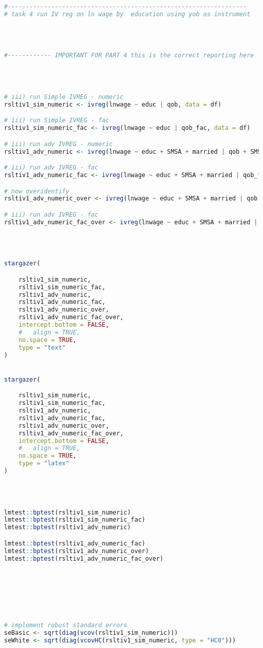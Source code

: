 \documentclass[a4paper]{article}
\begin{document}
\begin{lstlisting}[language=R]
#------------------------------------------------------------------
# task 4 run IV reg on ln wage by  education using yob as instrument




#------------ IMPORTANT FOR PART 4 this is the correct reporting here




# iii) run Simple IVREG - numeric
rsltiv1_sim_numeric <- ivreg(lnwage ~ educ | qob, data = df)

# iii) run Simple IVREG - fac
rsltiv1_sim_numeric_fac <- ivreg(lnwage ~ educ | qob_fac, data = df)

# iii) run adv IVREG - numeric
rsltiv1_adv_numeric <- ivreg(lnwage ~ educ + SMSA + married | qob + SMSA + married, data = df)

# iii) run adv IVREG - fac
rsltiv1_adv_numeric_fac <- ivreg(lnwage ~ educ + SMSA + married | qob_fac + SMSA + married, data = df)

# now overidentify
rsltiv1_adv_numeric_over <- ivreg(lnwage ~ educ + SMSA + married | qob + yob + SMSA + married, data = df)

# iii) run adv IVREG - fac
rsltiv1_adv_numeric_fac_over <- ivreg(lnwage ~ educ + SMSA + married | qob_fac + yob + SMSA + married, data = df)




stargazer(

    rsltiv1_sim_numeric,
    rsltiv1_sim_numeric_fac,
    rsltiv1_adv_numeric,
    rsltiv1_adv_numeric_fac,
    rsltiv1_adv_numeric_over,
    rsltiv1_adv_numeric_fac_over,
    intercept.bottom = FALSE,
    #   align = TRUE,
    no.space = TRUE,
    type = "text"
)


stargazer(

    rsltiv1_sim_numeric,
    rsltiv1_sim_numeric_fac,
    rsltiv1_adv_numeric,
    rsltiv1_adv_numeric_fac,
    rsltiv1_adv_numeric_over,
    rsltiv1_adv_numeric_fac_over,
    intercept.bottom = FALSE,
    #   align = TRUE,
    no.space = TRUE,
    type = "latex"
)




lmtest::bptest(rsltiv1_sim_numeric)
lmtest::bptest(rsltiv1_sim_numeric_fac)
lmtest::bptest(rsltiv1_adv_numeric)

lmtest::bptest(rsltiv1_adv_numeric_fac)
lmtest::bptest(rsltiv1_adv_numeric_over)
lmtest::bptest(rsltiv1_adv_numeric_fac_over)







# implement robust standard errors
seBasic <- sqrt(diag(vcov(rsltiv1_sim_numeric)))
seWhite <- sqrt(diag(vcovHC(rsltiv1_sim_numeric, type = "HC0")))



\end{lstlisting}
\end{document}
